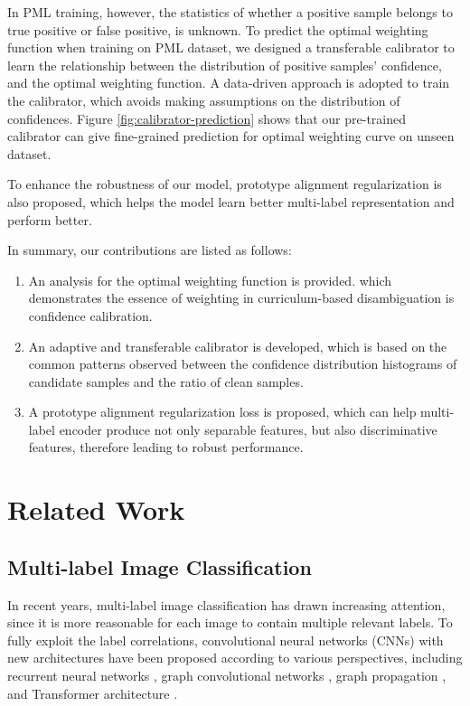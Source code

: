 \documentclass[letterpaper]{article} %
\begin{document}
  In PML training, however, the statistics of whether a positive sample belongs to true positive or false positive, is unknown. To predict the optimal weighting function when training on PML dataset, we designed a transferable calibrator to learn the relationship between the distribution of positive samples' confidence, and the optimal weighting function. A data-driven approach is adopted to train the calibrator, which avoids making assumptions on the distribution of confidences. Figure \ref{fig:calibrator-prediction} shows that our pre-trained calibrator can give fine-grained prediction for optimal weighting curve on unseen dataset. 

  To enhance the robustness of our model, prototype alignment regularization is also proposed, which helps the model learn better multi-label representation and perform better.

  In summary, our contributions are listed as follows:

  \begin{enumerate}

    \item An analysis for the optimal weighting function is provided. which demonstrates the essence of weighting in curriculum-based disambiguation is confidence calibration. 

    \item An adaptive and transferable calibrator is developed, which is based on the common patterns observed between the confidence distribution histograms of candidate samples and the ratio of clean samples.

    \item A prototype alignment regularization loss is proposed, which can help multi-label encoder produce not only separable features, but also discriminative features, therefore leading to robust performance.

  \end{enumerate}


\section{Related Work}

\subsection{Multi-label Image Classification}

  In recent years, multi-label image classification has drawn increasing attention, since it is more reasonable for each image to contain multiple relevant labels\cite{GAELLE}. To fully exploit the label correlations, convolutional neural networks (CNNs) with new architectures have been proposed according to various perspectives, including recurrent neural networks \cite{cnn-rnn}, graph convolutional networks \cite{ML-GCN,ML-AGCN}, graph propagation \cite{Scene-aware}, and Transformer architecture \cite{Query2Label,C-Tran}.
\end{document}
